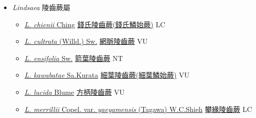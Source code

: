 
  \begin{itemize}
 \item[] \textit{Lindsaea} 陵齒蕨屬
                    
  \begin{itemize}
        \item[] \href{http://www.theplantlist.org/tpl1.1/search?q=Lindsaea+chienii}{\textit{L. chienii} Ching}   \href{\detokenize{http://taibnet.sinica.edu.tw/chi/taibnet_species_list.php?T2=錢氏陵齒蕨&T2_new_value=true&fr=y}}{錢氏陵齒蕨(錢氏鱗始蕨)}   LC
        \item[] \href{http://www.theplantlist.org/tpl1.1/search?q=Lindsaea+cultrata}{\textit{L. cultrata} (Willd.) Sw.}   \href{\detokenize{http://taibnet.sinica.edu.tw/chi/taibnet_species_list.php?T2=網脈陵齒蕨&T2_new_value=true&fr=y}}{網脈陵齒蕨} VU
        \item[] \href{http://www.theplantlist.org/tpl1.1/search?q=Lindsaea+ensifolia}{\textit{L. ensifolia} Sw.}   \href{\detokenize{http://taibnet.sinica.edu.tw/chi/taibnet_species_list.php?T2=箭葉陵齒蕨&T2_new_value=true&fr=y}}{箭葉陵齒蕨} NT
        \item[] \href{http://www.theplantlist.org/tpl1.1/search?q=Lindsaea+kawabatae}{\textit{L. kawabatae} Sa.Kurata}   \href{\detokenize{http://taibnet.sinica.edu.tw/chi/taibnet_species_list.php?T2=細葉陵齒蕨&T2_new_value=true&fr=y}}{細葉陵齒蕨(細葉鱗始蕨)}   VU
        \item[] \href{http://www.theplantlist.org/tpl1.1/search?q=Lindsaea+lucida}{\textit{L. lucida} Blume}     \href{\detokenize{http://taibnet.sinica.edu.tw/chi/taibnet_species_list.php?T2=方柄陵齒蕨&T2_new_value=true&fr=y}}{方柄陵齒蕨} VU
        \item[] \href{http://www.theplantlist.org/tpl1.1/search?q=Lindsaea+merrillii+var.+yaeyamensis}{\textit{L. merrillii} Copel. var. \textit{yaeyamensis} (Tagawa) W.C.Shieh}   \href{\detokenize{http://taibnet.sinica.edu.tw/chi/taibnet_species_list.php?T2=攀緣陵齒蕨&T2_new_value=true&fr=y}}{攀緣陵齒蕨} LC

\end{itemize}
\end{itemize}
